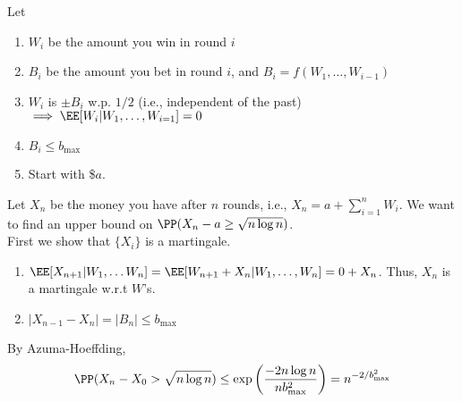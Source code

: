 \begin{eg}
Let 
\begin{enumerate}[label=(\roman*)]
    \item $W_i$ be the amount you win in  round $i$
    \item $B_i$ be the amount you bet in round $i$, and $B_i = f(W_1, \dots, W_{i-1})$
    \item $W_i$ is $\pm B_i$ w.p. $1/2$ (i.e., independent of the past) $\implies \EE[W_i | W_1, \dots, W_{i=1}] = 0$
    \item $B_i \leq b_{\text{max}}$
    \item Start with \$$a$.
\end{enumerate}
Let $X_n$ be the money you have after $n$ rounds, i.e., $X_n = a  + \sum_{i=1}^n W_i$. We want to find an upper bound on $\PP(X_n - a \geq \sqrt{n\log n})$. \\
First we show that $\{X_i\}$ is a martingale.
\begin{enumerate}
    \item $\EE[X_{n+1} | W_1, \dots W_n] = \EE[W_{n+1} + X_n | W_1, \dots, W_n] = 0 + X_n$. Thus, $X_n$ is a martingale w.r.t $W$'s.
    \item $|X_{n-1} - X_{n}| = |B_n| \leq b_{\text{max}}$
\end{enumerate}
By Azuma-Hoeffding,
\[
\PP(X_n - X_0 > \sqrt{n\log n}) \leq \exp\left(\frac{-2n\log n}{nb_{\text{max}}^2}\right) = n^{-2/b^2_\text{max}}
\]
\end{eg}
